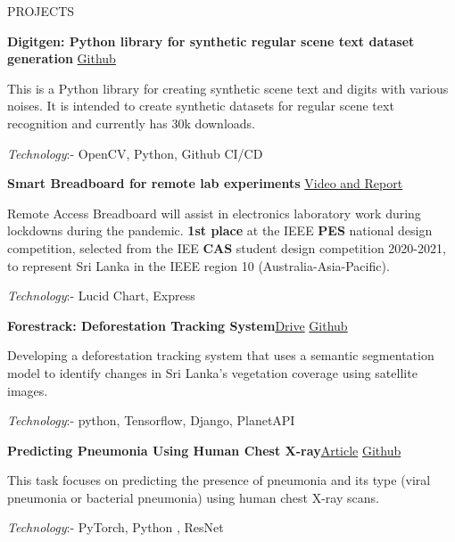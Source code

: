 \documentclass{resume} %
\begin{document}
\begin{rSection}{PROJECTS}
\vspace{-1.25em}
\item \textbf{Digitgen: Python library for synthetic regular scene text dataset generation }\hfill \href{https://github.com/ACRA-FL/digitgen}{Github}

This is a Python library for creating synthetic scene text and digits with various noises. It is intended to create synthetic datasets for regular scene text recognition and currently has 30k downloads.

\textit{Technology}:- OpenCV, Python, Github CI/CD
\item \textbf{Smart Breadboard for remote lab experiments }\hfill \href{https://drive.google.com/drive/u/0/folders/1xaSNThewvvsGVQ5pdaWTqzAHVvRtRN91}{Video and Report}

Remote Access Breadboard will assist in electronics laboratory work during lockdowns during the pandemic. {\bf 1st place} at the IEEE {\bf PES} national design competition, selected from the IEE {\bf CAS} student design competition 2020-2021, to represent Sri Lanka in the IEEE region 10 (Australia-Asia-Pacific).

\textit{Technology}:- Lucid Chart, Express 
\item \textbf{Forestrack: Deforestation Tracking System}\hfill \href{https://drive.google.com/drive/folders/1QNPDZ0rpAtmN9D_4cJCMls4uN9GD2Hs8?usp=sharing}{Drive}
\hspace{2mm}
\href{https://github.com/Deforestration-Tracker-ADK/forestrack-core}{Github}

Developing a deforestation tracking system that uses a semantic segmentation model to identify changes in Sri Lanka's vegetation coverage using satellite images.

\textit{Technology}:- python, Tensorflow, Django, PlanetAPI

\item \textbf{Predicting Pneumonia Using Human Chest X-ray}\hfill \href{https://medium.com/@devin.18/predicting-the-probability-of-pneumonia-using-chest-x-rays-and-cnns-67457529cf28}{Article}
\hspace{2mm}
\href{https://github.com/DevinDeSilva/Pneaumonia_prediction_using_chest_xrays}{Github}

This task focuses on predicting the presence of pneumonia and its type (viral pneumonia or bacterial pneumonia) using human chest X-ray scans.

\textit{Technology}:- PyTorch, Python , ResNet


\end{rSection}
\end{document}
